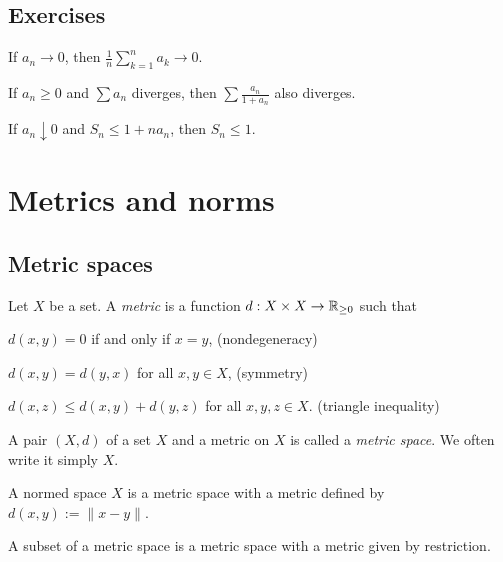 \documentclass{../note}
\begin{document}
\section*{Exercises}

\begin{prb}
If $a_n\to0$, then $\frac1n\sum_{k=1}^na_k\to0$.
\end{prb}

\begin{prb}
If $a_n\ge0$ and $\sum a_n$ diverges, then $\sum\frac{a_n}{1+a_n}$ also diverges.
\end{prb}

\begin{prb}
If $a_n\downarrow0$ and $S_n\le1+na_n$, then $S_n\le1$.
\end{prb}






\chapter{Metrics and norms}
\section{Metric spaces}
\begin{prb}
Let $X$ be a set.
A \emph{metric} is a function $d:X\times X\to\mathbb{R}_{\ge0}$ such that
\begin{parts}[(i)]
\item $d(x,y)=0$ if and only if $x=y$, \hfill(nondegeneracy)
\item $d(x,y)=d(y,x)$ for all $x,y\in X$, \hfill(symmetry)
\item $d(x,z)\le d(x,y)+d(y,z)$ for all $x,y,z\in X$. \hfill(triangle inequality)
\end{parts}
A pair $(X,d)$ of a set $X$ and a metric on $X$ is called a \emph{metric space}.
We often write it simply $X$.
\begin{parts}
\item
A normed space $X$ is a metric space with a metric defined by $d(x,y):=\|x-y\|$.
\item
A subset of a metric space is a metric space with a metric given by restriction.
\end{parts}
\end{prb}
\end{document}
